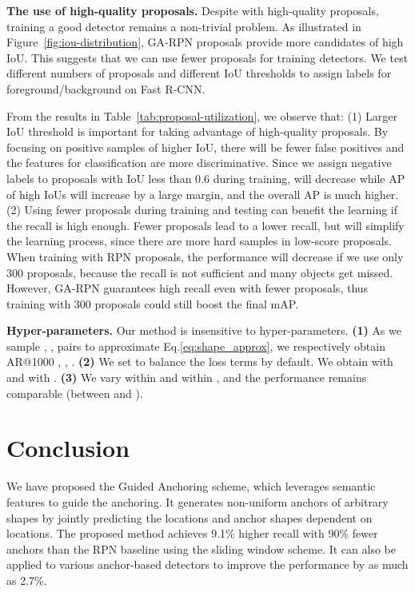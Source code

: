 \documentclass[10pt,twocolumn,letterpaper]{article}
\begin{document}
\noindent
\textbf{The use of high-quality proposals.}
Despite with high-quality proposals, training a good detector remains a non-trivial problem.
As illustrated in Figure~\ref{fig:iou-distribution}, GA-RPN proposals provide
more candidates of high IoU. This suggests that we can use fewer proposals
for training detectors.
We test different numbers of proposals and different IoU thresholds to assign
labels for foreground/background on Fast R-CNN.

From the results in Table~\ref{tab:proposal-utilization}, we observe that:
(1) Larger IoU threshold is important for taking advantage of high-quality proposals.
By focusing on positive samples of higher IoU, there will be fewer false
positives and the features for classification are more discriminative.
Since we assign negative labels to proposals with IoU less than 0.6 during training,
 will decrease while AP of high IoUs will
increase by a large margin, and the overall AP is much higher.
(2) Using fewer proposals during training and testing can benefit the learning
if the recall is high enough.
Fewer proposals lead to a lower recall, but will simplify the learning process,
since there are more hard samples in low-score proposals.
When training with RPN proposals, the performance will decrease if we use only
300 proposals, because the recall is not sufficient and many objects get missed.
However, GA-RPN guarantees high recall even with fewer proposals, thus training
with 300 proposals could still boost the final mAP.

\noindent
\textbf{Hyper-parameters.}
Our method is insensitive to hyper-parameters.
\textbf{(1)}
As we sample , ,  pairs to approximate Eq.\eqref{eq:shape_approx}, we respectively obtain AR@1000 , , .
\textbf{(2)}
We set  to balance the loss terms by default.
We obtain  with  and
 with .
\textbf{(3)}
We vary  within  and  within ,
and the performance remains comparable (between  and ).
 

\section{Conclusion}
\label{sec:conclusion}

We have proposed the Guided Anchoring scheme, which leverages semantic features
to guide the anchoring. It generates non-uniform anchors of arbitrary shapes by
jointly predicting the locations and anchor shapes dependent on locations.
The proposed method achieves 9.1\% higher recall with 90\% fewer anchors than
the RPN baseline using the sliding window scheme. It can also be applied to
various anchor-based detectors to improve the performance by as much as 2.7\%.
\end{document}
